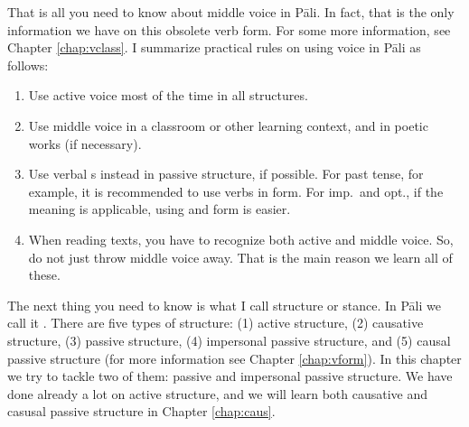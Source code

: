 That is all you need to know about middle voice in P\=ali. In fact, that is the only information we have on this obsolete verb form. For some more information, see Chapter \ref{chap:vclass}. I summarize practical rules on using voice in P\=ali as follows:
\begin{enumerate}
\item Use active voice most of the time in all structures.
\item Use middle voice in a classroom or other learning context, and in poetic works (if necessary).
\item Use verbal s instead in passive structure, if possible. For past tense, for example, it is recommended to use verbs in  form. For imp.\ and opt., if the meaning is applicable, using  and  form is easier.
\item When reading texts, you have to recognize both active and middle voice. So, do not just throw middle voice away. That is the main reason we learn all of these.
\end{enumerate}

The next thing you need to know is what I call structure or stance. In P\=ali we call it . There are five types of structure: (1) active structure, (2) causative structure, (3) passive structure, (4) impersonal passive structure, and (5) causal passive structure (for more information see Chapter \ref{chap:vform}). In this chapter we try to tackle two of them: passive and impersonal passive structure. We have done already a lot on active structure, and we will learn both causative and casusal passive structure in Chapter \ref{chap:caus}.

